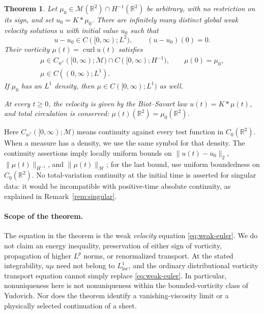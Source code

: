 \documentclass[11pt,a4paper,reqno]{amsart}
\theoremstyle{plain}
\newtheorem{theorem}{Theorem}[section]
\theoremstyle{definition}
\theoremstyle{remark}
\numberwithin{equation}{section}
\newcommand{\R}{\mathbb R}
\newcommand{\M}{\mathcal M}
\newcommand{\curl}{\operatorname{curl}}
\begin{document}
\begin{theorem}\label{thm:main}
Let $\mu_0\in\M(\R^2)\cap H^{-1}(\R^2)$ be arbitrary, with no
restriction on its sign, and set $u_0=K*\mu_0$. There are infinitely
many distinct global weak velocity solutions $u$ with initial value
$u_0$ such that
\begin{equation}\label{eq:main-velocity}
 u-u_0\in C([0,\infty);L^2),\qquad (u-u_0)(0)=0.
\end{equation}
Their vorticity $\mu(t)=\curl u(t)$ satisfies
\begin{equation}\label{eq:main-vorticity}
 \begin{gathered}
 \mu\in C_{w^*}([0,\infty);\M)\cap C([0,\infty);H^{-1}),
 \qquad \mu(0)=\mu_0,\\
 \mu\in C((0,\infty);L^1).
 \end{gathered}
\end{equation}
If $\mu_0$ has an $L^1$ density, then
$\mu\in C([0,\infty);L^1)$ as well.

At every $t\ge0$, the velocity is given by the Biot--Savart law
$u(t)=K*\mu(t)$, and total circulation is conserved:
$\mu(t)(\R^2)=\mu_0(\R^2)$.
\end{theorem}

Here $C_{w^*}([0,\infty);\M)$ means continuity against every test
function in $C_0(\R^2)$. When a measure has a density, we use the
same symbol for that density. The continuity assertions imply locally
uniform bounds on $\|u(t)-u_0\|_2$, $\|\mu(t)\|_{H^{-1}}$, and
$\|\mu(t)\|_{\M}$; for the last bound, use uniform boundedness on
$C_0(\R^2)$. No total-variation continuity at the initial time is
asserted for singular data: it would be incompatible with
positive-time absolute continuity, as explained in
Remark~\ref{rem:singular}.

\paragraph{Scope of the theorem.}
The equation in the theorem is the weak \emph{velocity} equation
\eqref{eq:weak-euler}. We do not claim an energy inequality,
preservation of either sign of vorticity, propagation of higher
$L^p$ norms, or renormalized transport. At the stated integrability,
$u\mu$ need not belong to $L^1_{\mathrm{loc}}$, and the ordinary
distributional vorticity transport equation cannot simply replace
\eqref{eq:weak-euler}. In particular, nonuniqueness here is not
nonuniqueness within the bounded-vorticity class of Yudovich. Nor does
the theorem identify a vanishing-viscosity limit or a physically
selected continuation of a sheet.
\end{document}
